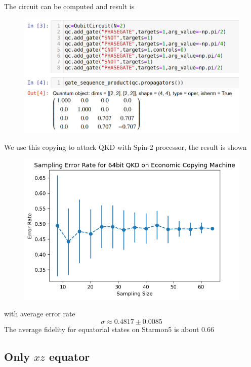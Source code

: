 \documentclass[11pt]{article}
\begin{document}
The circuit can be computed and result is 
\begin{figure}[h]
    \includegraphics[width=0.8\linewidth]{Figures/CH.png}
\end{figure}

We use this copying to attack QKD with Spin-2 processor, the result is shown
\begin{figure}[h]
    \includegraphics[width=0.8\linewidth]{Figures/economic_qkd.png}
\end{figure}
with average error rate 
\[
    \sigma\approx 0.4817\pm 0.0085
\]
The average fidelity for equatorial states on Starmon5 is about 0.66


\subsection{Only $xz$ equator}
\end{document}
